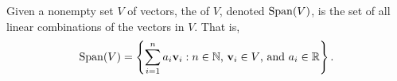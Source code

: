 \documentclass{ximera}
\begin{document}



\begin{definition}
  Given a nonempty set $V$ of vectors, the  of $V$, denoted
  $\operatorname{Span}(V)$, is the set of all linear combinations of the vectors in
  $V$. That is,
  \[
    \operatorname{Span}(V) = \left\{\sum_{i=1}^n a_i\mathbf{v}_i:\text{$n\in \mathbb N$,
      $\mathbf{v}_i\in V$, and $a_i\in \mathbb{R}$}\right\}.
  \]
\end{definition}
\end{document}
